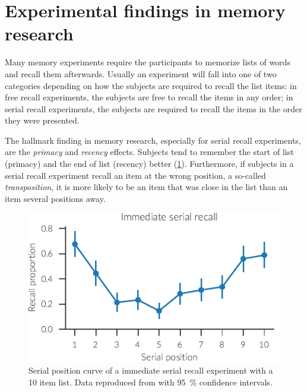 \section{Experimental findings in memory research}\label{sec:exp-findings}
Many memory experiments require the participants to memorize lists of words and recall them afterwards.
Usually an experiment will fall into one of two categories depending on how the subjects are required to recall the list items: in free recall experiments, the subjects are free to recall the items in any order; in serial recall experiments, the subjects are required to recall the items in the order they were presented.

The hallmark finding in memory research, especially for serial recall experiments, are the \emph{primacy} and \emph{recency} effects.
Subjects tend to remember the start of list (primacy) and the end of list (recency) better (\cref{fig:exp-serial-pos}).
Furthermore, if subjects in a serial recall experiment recall an item at the wrong position, a so-called \emph{transposition}, it is more likely to be an item that was close in the list than an item several positions away.
\begin{figure}
    \centering
    \includegraphics{figures/exp-serial-pos}
    \caption[Immediate serial recall position curve]{Serial position curve of a immediate serial recall experiment with a 10 item list. Data reproduced from \textcite{Jahnke1968} with \SI{95}{\percent} confidence intervals.}\label{fig:exp-serial-pos}
\end{figure}

